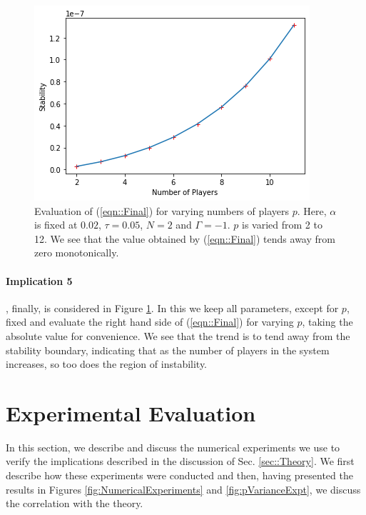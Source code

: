 \documentclass[sigconf,anonymous]{aamas}
\begin{document}
\begin{figure}[t]
    \centering
    \includegraphics[width = .75\linewidth]{Figures/pVariance.png}
    \caption{Evaluation of (\ref{eqn::Final}) for varying numbers of players $p$. Here, $\alpha$ is fixed at $0.02$, $\tau = 0.05$, $N = 2$ and $\Gamma = -1$. $p$ is varied from 2 to 12. We see that the value obtained by (\ref{eqn::Final}) tends away from zero monotonically.}
    \label{fig:pvariation}
\end{figure}

\paragraph{Implication 5}, finally, is considered in Figure \ref{fig:pvariation}. In this we keep all parameters, except for $p$, fixed and evaluate the right hand side of (\ref{eqn::Final}) for varying $p$, taking the absolute value for convenience. We see that the trend is to tend away from the stability boundary, indicating that as the number of players in the system increases, so too does the region of instability.



\section{Experimental Evaluation} \label{sec:exev}

In this section, we describe and discuss the numerical experiments we use to verify the implications described in the discussion of Sec. \ref{sec::Theory}. We first describe how these experiments were conducted and then, having presented the results in Figures \ref{fig:NumericalExperiments} and \ref{fig:pVarianceExpt}, we discuss the correlation with the theory.
\end{document}
